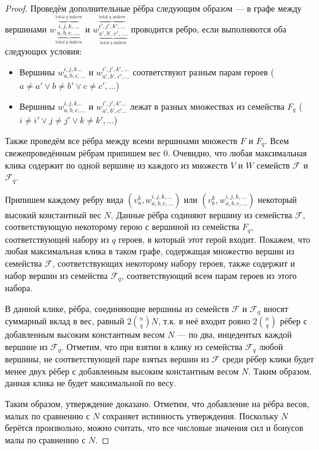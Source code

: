\documentclass{article}
\begin{document}
\begin{proof}
    Проведём дополнительные рёбра следующим образом --- в графе между вершинами $w_{\underbrace{a, b, c, ....}_\text{total $q$ indices}}^{\overbrace{i,j,k,...}^\text{total $q$ indices}}$ и $w_{\underbrace{a', b', c', ....}_\text{total $q$ indices}}^{\overbrace{i',j',k',...}^\text{total $q$ indices}}$ проводится ребро, если выполняются оба следующих условия:
    \begin{itemize}
        \item Вершины $w_{a,b,c,...}^{i,j,k...}$ и $w_{a',b',c',...}^{i', j',k',...}$ соответствуют разным парам героев ($a \neq a' \lor b \neq b' \lor c \neq c',...$)
        \item Вершины $w_{a,b,c,...}^{i,j,k...}$ и $w_{a',b',c'...}^{i', j',k'...}$ лежат в разных множествах из семейства $F_q$ ($i \neq i' \lor j \neq j' \lor k \neq k',... $)
    \end{itemize}
    
    Также проведём все рёбра между всеми вершинами множеств $F$ и $F_q$. Всем свежепроведённым рёбрам припишем вес 0. Очевидно, что любая максимальная клика содержит по одной вершине из каждого из множеств $V$ и $W$ семейств $\mathcal{F}$ и $\mathcal{F}_q$. 
    
    Припишем каждому ребру вида $(v_a^k, w_{a,b,c,...}^{i,j,k,...})$ или $(v_b^k, w_{a,b,c,...}^{i, j,k,...})$ некоторый высокий константный вес $N$. Данные рёбра содиняют вершину из семейства $\mathcal{F}$, соответствующую некоторому герою с вершиной из семейства $F_q$, соответствующей набору из $q$ героев, в который этот герой входит. Покажем, что любая максимальная клика в таком графе, содержащая множество вершин из семейства $\mathcal{F}$, соответствующих некоторому набору героев, также содержит и набор вершин из семейства $\mathcal{F}_q$, соответствующий всем парам героев из этого набора.
    
    В данной клике, рёбра, соединяющие вершины из семейств $\mathcal{F}$ и $\mathcal{F}_q$ вносят суммарный вклад в вес, равный $2 \binom{n}{q} N$, т.к. в неё входит ровно $2 \binom{n}{q}$ рёбер с добавленным высоким константным весом $N$ --- по два, инцедентых каждой вершине из $\mathcal{F}_q$. Отметим, что при взятии в клику из семейства $\mathcal{F}_q$ любой вершины, не соответствующей паре взятых вершин из $\mathcal{F}$ среди рёбер клики будет менее двух рёбер с добавленным высоким константным весом $N$. Таким образом, данная клика не будет максимальной по весу.
    
Таким образом, утверждение доказано. Отметим, что добавление на рёбра весов, малых по сравнению с $N$ сохраняет истинность утверждения. Поскольку $N$ берётся произвольно, можно считать, что все числовые значения сил и бонусов малы по сравнению с $N$.


\end{proof}
\end{document}
